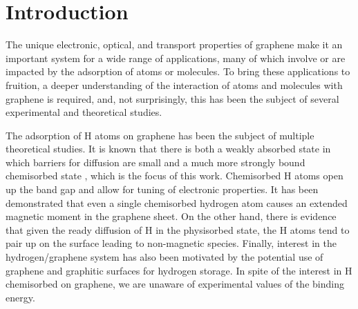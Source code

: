 \section{Introduction}
The unique electronic, optical, and transport properties of graphene make it an important system for a wide range of applications, many of which involve or are impacted by the adsorption of atoms or molecules.
To bring these applications to fruition, a deeper understanding of the interaction of atoms and molecules with graphene is required, and, not surprisingly, this has been the subject of several experimental and theoretical studies. \cite{10.1021/acs.jpca.0c06595,10.1016/j.carbon.2021.02.056,10.1063/1.3569134,10.1103/PhysRevB.100.075430,10.1103/PhysRevB.84.033402, 10.1039/D1CP02473F,10.1126/science.1158877,10.1038/nature04233,10.1134/S1995078020030027,10.1016/j.rser.2015.05.011,10.3390/reactions2030014,10.1063/1.2963976,10.1021/nl801417w}

The adsorption of H atoms on graphene has been the subject of multiple theoretical studies.\cite{10.1063/1.3569134,10.1016/j.rser.2015.05.011, 10.1063/1.2963976,10.1021/nl801417w}
It is known that there is both a weakly absorbed state in which barriers for diffusion are small and a much more strongly bound chemisorbed state \cite{10.1016/S0039-60280101602-8,10.1016/S0009-26149801337-2}, which is the focus of this work.
Chemisorbed H atoms open up the band gap and allow for tuning of electronic properties. \cite{10.1007/s40089-017-0203-5}
It has been demonstrated that even a single chemisorbed hydrogen atom causes an extended magnetic moment in the graphene sheet.\cite{10.1126/science.aad8038,10.1088/2053-1583/ab03a0} 
On the other hand, there is evidence that given the ready diffusion of H in the physisorbed state, the H atoms tend to pair up on the surface leading to non-magnetic species.\cite{10.1088/2053-1583/ab03a0}
Finally, interest in the hydrogen/graphene system has also been motivated by the potential use of graphene and graphitic surfaces for hydrogen storage.\cite{10.1134/S1995078020030027}
In spite of the interest in H chemisorbed on graphene, we are unaware of experimental values of the binding energy.

